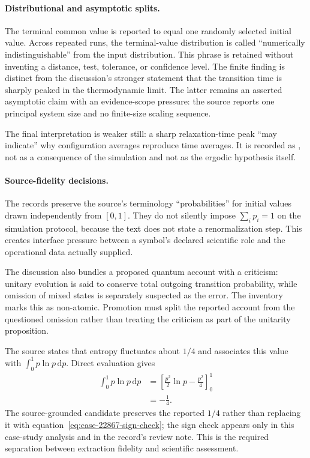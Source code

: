 \paragraph{Distributional and asymptotic splits.}
The terminal common value is reported to equal one randomly selected initial value. Across repeated runs, the terminal-value distribution is called ``numerically indistinguishable'' from the input distribution. This phrase is retained without inventing a distance, test, tolerance, or confidence level. The finite finding is distinct from the discussion's stronger statement that the transition time is sharply peaked in the thermodynamic limit. The latter remains an asserted asymptotic claim with an evidence-scope pressure: the source reports one principal system size and no finite-size scaling sequence.

The final interpretation is weaker still: a sharp relaxation-time peak ``may indicate'' why configuration averages reproduce time averages. It is recorded as , not as a consequence of the simulation and not as the ergodic hypothesis itself.

\paragraph{Source-fidelity decisions.}
The records preserve the source's terminology ``probabilities'' for initial values drawn independently from $[0,1]$. They do not silently impose $\sum_i p_i=1$ on the simulation protocol, because the text does not state a renormalization step. This creates interface pressure between a symbol's declared scientific role and the operational data actually supplied.

The discussion also bundles a proposed quantum account with a criticism: unitary evolution is said to conserve total outgoing transition probability, while omission of mixed states is separately suspected as the error. The inventory marks this as non-atomic. Promotion must split the reported account from the questioned omission rather than treating the criticism as part of the unitarity proposition.

The source states that entropy fluctuates about $1/4$ and associates this value with $\int_0^1p\ln p\,\mathrm dp$. Direct evaluation gives
\begin{align}
\int_0^1p\ln p\,\mathrm dp
  &=\left[\frac{p^2}{2}\ln p-\frac{p^2}{4}\right]_0^1\\
  &=-\frac14.
\label{eq:case-22867-sign-check}
\end{align}
The source-grounded candidate preserves the reported $1/4$ rather than replacing it with equation~\ref{eq:case-22867-sign-check}; the sign check appears only in this case-study analysis and in the record's review note. This is the required separation between extraction fidelity and scientific assessment.

